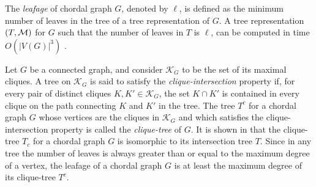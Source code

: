  
The \emph{leafage} of chordal graph $G$, denoted by $\ell$, is defined as 
the minimum number of leaves in the tree of a tree representation of $G$.
A tree representation $(T,{\mathcal M})$ for $G$ such that the number of leaves in $T$ is $\ell$, can be computed in time $O(|V(G)|^3)$ \cite{DBLP:conf/esa/HabibS09}. 

Let $G$ be a connected graph, and consider $\mathcal{K}_G$ to be the set of its maximal cliques. A tree on $\mathcal{K}_G$ is said to satisfy the \emph{clique-intersection} property if, for every pair of distinct cliques $K, K' \in \mathcal{K}_G$, the set $K\cap K'$ is contained in every clique on the path connecting $K$ and $K'$ in the tree. The tree $T^c$ for a chordal graph $G$ whose vertices are the cliques in $\mathcal{K}_G$ and which satisfies the clique-intersection property is called the \emph{clique-tree} of $G$. It is shown in \cite{10.1007/978-1-4613-8369-7_1} that the clique-tree $T_c$ for a chordal graph $G$ is isomorphic to its intersection tree $T$. Since in any tree the number of leaves is always greater than or equal to the maximum degree of a vertex, the leafage of a chordal graph $G$ is at least the 
maximum degree of its clique-tree $T^c$.
 
%
%
%
%
%
%
%

